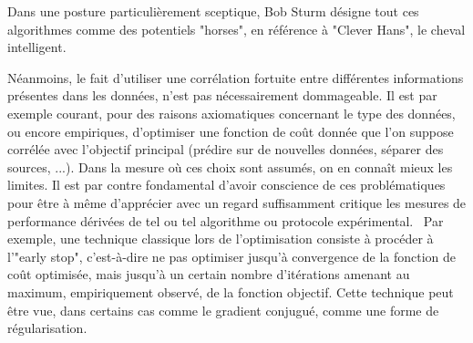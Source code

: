 Dans une posture particulièrement sceptique, Bob Sturm désigne tout ces algorithmes comme des potentiels "horses", en référence à "Clever Hans", le cheval intelligent.

Néanmoins, le fait d'utiliser une corrélation fortuite entre différentes informations présentes dans les données, n'est pas nécessairement dommageable. Il est par exemple courant, pour des raisons axiomatiques concernant le type des données, ou encore empiriques, d'optimiser une fonction de coût donnée que l'on suppose corrélée avec l'objectif principal (prédire sur de nouvelles données, séparer des sources, ...). Dans la mesure où ces choix sont assumés, on en connaît mieux les limites. Il est par contre fondamental d'avoir conscience de ces problématiques pour être à même d'apprécier avec un regard suffisamment critique les mesures de performance dérivées de tel ou tel algorithme ou protocole expérimental.~\cite{lagrangehal-01635373} Par exemple, une technique classique lors de l'optimisation consiste à procéder à l'"early stop", c'est-à-dire ne pas optimiser jusqu'à convergence de la fonction de coût optimisée, mais jusqu'à un certain nombre d'itérations amenant au maximum, empiriquement observé, de la fonction objectif. Cette technique peut être vue, dans certains cas comme le gradient conjugué, comme une forme de régularisation.

